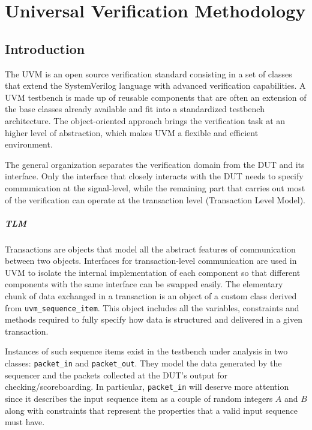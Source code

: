 \chapter{Universal Verification Methodology}
\section{Introduction}
The UVM is an open source verification standard consisting in a set of classes that extend the SystemVerilog language with advanced verification capabilities. A UVM testbench is made up of reusable components that are often an extension of the base classes already available and fit into a standardized testbench architecture. The object-oriented approach brings the verification task at an higher level of abstraction, which makes UVM a flexible and efficient environment. 

The general organization separates the verification domain from the DUT and its interface. Only the interface that closely interacts with the DUT needs to specify communication at the signal-level, while the remaining part that carries out most of the verification can operate at the transaction level (Transaction Level Model). 

\paragraph{TLM} Transactions are objects that model all the abstract features of communication between two objects. Interfaces for transaction-level communication are used in UVM to isolate the internal implementation of each component so that different components with the same interface can be swapped easily.
The elementary chunk of data exchanged in a transaction is an object of a custom class derived from \texttt{uvm\_sequence\_item}. This object includes all the variables, constraints and methods required to fully specify how data is structured and delivered in a given transaction. 

Instances of such sequence items exist in the testbench under analysis in two classes: \texttt{packet\_in} and \texttt{packet\_out}. They model the data generated by the sequencer and the packets collected at the DUT's output for checking/scoreboarding. In particular, \texttt{packet\_in} will deserve more attention since it describes the input sequence item as a couple of random integers $A$ and $B$ along with constraints that represent the properties that a valid input sequence must have.

